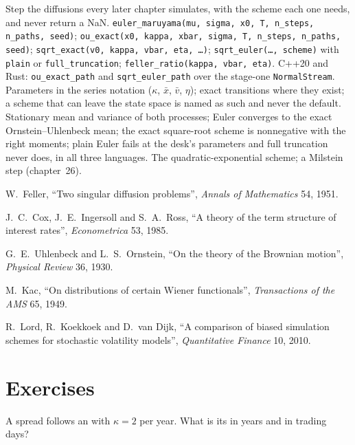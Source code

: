 \begin{build}
 Step the diffusions every later chapter simulates, with the scheme each one
needs, and never return a NaN.
 \texttt{euler\_maruyama(mu, sigma, x0, T, n\_steps, n\_paths, seed)};
\texttt{ou\_exact(x0, kappa, xbar, sigma, T, n\_steps, n\_paths, seed)}; \texttt{sqrt\_exact(v0,
kappa, vbar, eta, \dots)}; \texttt{sqrt\_euler(\dots, scheme)} with \texttt{plain} or
\texttt{full\_truncation}; \texttt{feller\_ratio(kappa, vbar, eta)}. C++20 and Rust:
\texttt{ou\_exact\_path} and \texttt{sqrt\_euler\_path} over the stage-one \texttt{NormalStream}.
 Parameters in the series notation ($\kappa$, $\bar x$, $\bar v$, $\eta$); exact transitions where
they exist; a scheme that can leave the state space is named as such and never the default.
 Stationary mean and variance of both processes; Euler converges to the
exact Ornstein--Uhlenbeck mean; the exact square-root scheme is nonnegative with the right
moments; plain Euler fails at the desk's parameters and full truncation never does, in all three
languages.
 The quadratic-exponential scheme; a Milstein step (chapter~26).
\end{build}

\begin{omsources}
\item W.~Feller, ``Two singular diffusion problems'', \emph{Annals of Mathematics} 54, 1951.
\item J.~C.~Cox, J.~E.~Ingersoll and S.~A.~Ross, ``A theory of the term structure of interest
rates'', \emph{Econometrica} 53, 1985.
\item G.~E.~Uhlenbeck and L.~S.~Ornstein, ``On the theory of the Brownian motion'',
\emph{Physical Review} 36, 1930.
\item M.~Kac, ``On distributions of certain Wiener functionals'', \emph{Transactions of the AMS}
65, 1949.
\item R.~Lord, R.~Koekkoek and D.~van Dijk, ``A comparison of biased simulation schemes for
stochastic volatility models'', \emph{Quantitative Finance} 10, 2010.
\end{omsources}

\section{Exercises}

\begin{exercise}[$\star$]\label{exo:qm:stochastic-differential-equations:1}
A spread follows an  with $\kappa = 2$ per year. What is its 
in years and in trading days?
\end{exercise}

